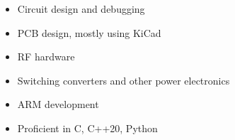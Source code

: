 \documentclass{res}
\begin{document}
\begin{resume}
\begin{itemize}
  \item Circuit design and debugging
  \item PCB design, mostly using KiCad
  \item RF hardware
  \item Switching converters and other power electronics
  \item ARM development
  \item Proficient in C, C++20, Python
\end{itemize}

\end{resume}
\end{document}
